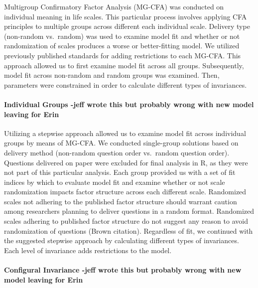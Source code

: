\documentclass[man,draftall]{apa6}
\let\oldparagraph\paragraph
\renewcommand{\paragraph}[1]{\oldparagraph{#1}\mbox{}}
\begin{document}
Multigroup Confirmatory Factor Analysis (MG-CFA) was conducted on individual meaning in life scales. This particular process involves applying CFA principles to multiple groups across different each individual scale. Delivery type (non-random vs.~random) was used to examine model fit and whether or not randomization of scales produces a worse or better-fitting model. We utilized previously published standards for adding restrictions to each MG-CFA. This approach allowed us to first examine model fit across all groups. Subsequently, model fit across non-random and random groups was examined. Then, parameters were constrained in order to calculate different types of invariances.

\hypertarget{individual-groups--jeff-wrote-this-but-probably-wrong-with-new-model-leaving-for-erin}{%
\paragraph{Individual Groups -jeff wrote this but probably wrong with new model leaving for Erin}\label{individual-groups--jeff-wrote-this-but-probably-wrong-with-new-model-leaving-for-erin}}

Utilizing a stepwise approach allowed us to examine model fit across individual groups by means of MG-CFA. We conducted single-group solutions based on delivery method (non-random question order vs.~random question order). Questions delivered on paper were excluded for final analysis in R, as they were not part of this particular analysis. Each group provided us with a set of fit indices by which to evaluate model fit and examine whether or not scale randomization impacts factor structure across each different scale. Randomized scales not adhering to the published factor structure should warrant caution among researchers planning to deliver questions in a random format. Randomized scales adhering to published factor structure do not suggest any reason to avoid randomization of questions (Brown citation). Regardless of fit, we continued with the suggested stepwise approach by calculating different types of invariances. Each level of invariance adds restrictions to the model.

\hypertarget{configural-invariance--jeff-wrote-this-but-probably-wrong-with-new-model-leaving-for-erin}{%
\paragraph{Configural Invariance -jeff wrote this but probably wrong with new model leaving for Erin}\label{configural-invariance--jeff-wrote-this-but-probably-wrong-with-new-model-leaving-for-erin}}
\end{document}
